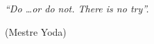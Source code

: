 \begin{center}
\vspace*{\fill}
\hspace{.45\textwidth} %
    \begin{minipage}{.5\textwidth}
    \flushright
    \noindent \textit{``Do \ldots or do not. There is no try''.}
    
    (Mestre Yoda)
    \end{minipage}
\end{center}
